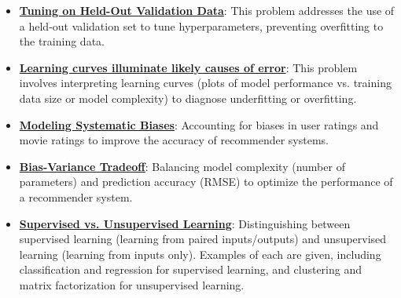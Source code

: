\documentclass{article}%
\begin{document}
\begin{itemize}[leftmargin=*]
\item \href{https://purdue.brightspace.com/d2l/common/assets/pdfjs-d2l-dist/1.0.14-legacy/web/viewer.html?file=\%2Fcontent\%2Fenforced\%2F1095467-wl.202510.CS.24300.001\%2F10L1-CrossValidation.pdf\%3Fou\%3D1095467\&lang=en-us\&container=d2l-fileviewer-rendered-pdf\&fullscreen=d2l-fileviewer-rendered-pdf-dialog\&height=667#page=19}{\textbf{Tuning on Held-Out Validation Data}}: This problem addresses the use of a held-out validation set to tune hyperparameters, preventing overfitting to the training data.%
\item \href{https://purdue.brightspace.com/d2l/common/assets/pdfjs-d2l-dist/1.0.14-legacy/web/viewer.html?file=\%2Fcontent\%2Fenforced\%2F1095467-wl.202510.CS.24300.001\%2F10L1-CrossValidation.pdf\%3Fou\%3D1095467\&lang=en-us\&container=d2l-fileviewer-rendered-pdf\&fullscreen=d2l-fileviewer-rendered-pdf-dialog\&height=667#page=20}{\textbf{Learning curves illuminate likely causes of error}}: This problem involves interpreting learning curves (plots of model performance vs. training data size or model complexity) to diagnose underfitting or overfitting.%
\item \href{https://purdue.brightspace.com/d2l/common/assets/pdfjs-d2l-dist/1.0.14-legacy/web/viewer.html?file=\%2Fcontent\%2Fenforced\%2F1095467-wl.202510.CS.24300.001\%2F11L2-svd-pca-recommender.pdf\%3Fou\%3D1095467\&lang=en-us\&container=d2l-fileviewer-rendered-pdf\&fullscreen=d2l-fileviewer-rendered-pdf-dialog\&height=667#page=40}{\textbf{Modeling Systematic Biases}}: Accounting for biases in user ratings and movie ratings to improve the accuracy of recommender systems.%
\item \href{https://purdue.brightspace.com/d2l/common/assets/pdfjs-d2l-dist/1.0.14-legacy/web/viewer.html?file=\%2Fcontent\%2Fenforced\%2F1095467-wl.202510.CS.24300.001\%2F11L2-svd-pca-recommender.pdf\%3Fou\%3D1095467\&lang=en-us\&container=d2l-fileviewer-rendered-pdf\&fullscreen=d2l-fileviewer-rendered-pdf-dialog\&height=667#page=53}{\textbf{Bias-Variance Tradeoff}}: Balancing model complexity (number of parameters) and prediction accuracy (RMSE) to optimize the performance of a recommender system.%
\item \href{https://purdue.brightspace.com/d2l/common/assets/pdfjs-d2l-dist/1.0.14-legacy/web/viewer.html?file=\%2Fcontent\%2Fenforced\%2F1095467-wl.202510.CS.24300.001\%2F12L2-distance-clusters.pdf\%3Fou\%3D1095467\&lang=en-us\&container=d2l-fileviewer-rendered-pdf\&fullscreen=d2l-fileviewer-rendered-pdf-dialog\&height=667#page=3}{\textbf{Supervised vs. Unsupervised Learning}}: Distinguishing between supervised learning (learning from paired inputs/outputs) and unsupervised learning (learning from inputs only). Examples of each are given, including classification and regression for supervised learning, and clustering and matrix factorization for unsupervised learning.%
\end{itemize}
\end{document}
